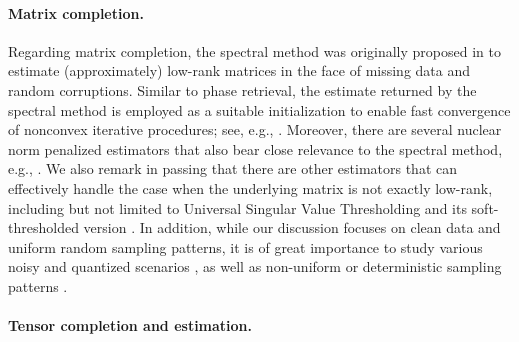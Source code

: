 \paragraph{Matrix completion.}

Regarding matrix completion, the spectral method was originally proposed in \citet{achlioptas2007fast,keshavan2010matrix} to estimate (approximately) low-rank matrices in the face of missing data and random corruptions.
Similar to phase retrieval, 
the estimate returned by the spectral method is employed as a suitable initialization to enable fast convergence of nonconvex iterative procedures;
see, e.g., \citet{keshavan2010matrix,keshavan2009matrix,jain2013low,hardt2014understanding,sun2016guaranteed,chen2015fast,zheng2016convergence,boumal2015low,wei2016guarantees,chen2020nonconvex,ma2017implicit,zhang2018fast,jin2016provable,charisopoulos2019lowrank}.
Moreover, there are several nuclear norm penalized estimators that also bear close relevance to the spectral method,
e.g., \citet{koltchinskii2011nuclear}.
We also remark in passing that there are other estimators that can effectively handle the case when the underlying matrix is not exactly low-rank, including but not limited to Universal Singular Value Thresholding \citep{chatterjee2014universal} and its soft-thresholded version \citep{koltchinskii2011nuclear}.
In addition, while our discussion focuses on clean data and uniform random sampling patterns,  it is of great importance to study various noisy and quantized scenarios \citep{keshavan2009matrix,candes2010matrix,cao2015poisson,klopp2014noisy,chen2015fast,mcrae2019low,davenport20141,ma2017implicit,zhang2018primal,krahmer2019convex}, 
as well as non-uniform or deterministic sampling patterns \citep{foucart2019weighted,negahban2012restricted,shapiro2018matrix}.







 \paragraph{Tensor completion and estimation.}

